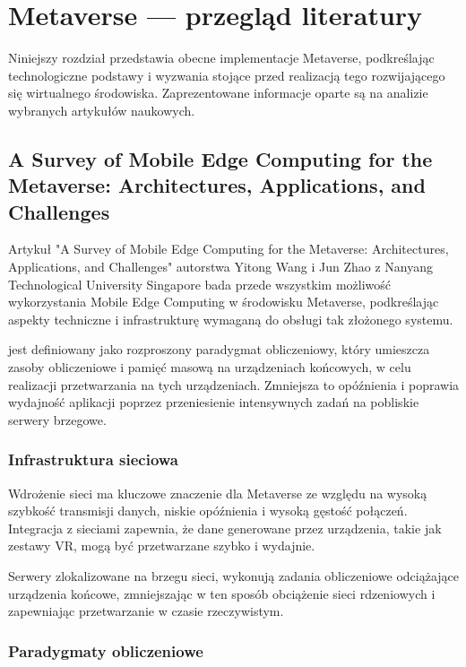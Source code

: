 \chapter{Metaverse --- przegląd literatury}

Niniejszy rozdział przedstawia obecne implementacje Metaverse, podkreślając technologiczne podstawy i wyzwania stojące przed realizacją tego rozwijającego się wirtualnego środowiska. Zaprezentowane informacje oparte są na analizie wybranych artykułów naukowych.

\section{A Survey of Mobile Edge Computing for the
Metaverse: Architectures, Applications, and
Challenges}

Artykuł "A Survey of Mobile Edge Computing for the Metaverse: Architectures, Applications, and Challenges" autorstwa Yitong Wang i Jun Zhao z Nanyang Technological University Singapore bada przede wszystkim możliwość wykorzystania Mobile Edge Computing  w środowisku Metaverse, podkreślając aspekty techniczne i infrastrukturę wymaganą do obsługi tak złożonego systemu.

 jest definiowany jako rozproszony paradygmat obliczeniowy, który umieszcza zasoby obliczeniowe i pamięć masową na urządzeniach końcowych, w celu realizacji przetwarzania na tych urządzeniach. Zmniejsza to opóźnienia i poprawia wydajność aplikacji poprzez przeniesienie intensywnych zadań na pobliskie serwery brzegowe.

\subsection{Infrastruktura sieciowa}

Wdrożenie sieci  ma kluczowe znaczenie dla Metaverse ze względu na wysoką szybkość transmisji danych, niskie opóźnienia i wysoką gęstość połączeń. Integracja  z sieciami  zapewnia, że dane generowane przez urządzenia, takie jak zestawy VR, mogą być przetwarzane szybko i wydajnie.

Serwery zlokalizowane na brzegu sieci, wykonują zadania obliczeniowe odciążające urządzenia końcowe, zmniejszając w ten sposób obciążenie sieci rdzeniowych i zapewniając przetwarzanie w czasie rzeczywistym.

\subsection{Paradygmaty obliczeniowe}

